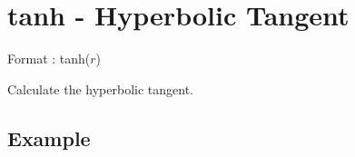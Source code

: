 %

\section{tanh - Hyperbolic Tangent\label{sect:tanh}}

Format : tanh($r$)

Calculate the hyperbolic tangent.

\subsection*{Example}


%


